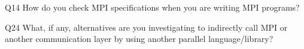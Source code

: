 \begin{description}%
\item{Q14} How do you check MPI specifications when you are writing MPI programs?%
\item{Q24} What, if any, alternatives are you investigating to indirectly call MPI or another communication layer by using another parallel language/library?%
\end{description}%
